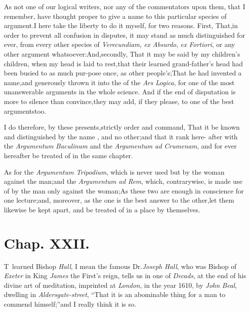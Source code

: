 \documentclass{article}
\begin{document}
As not one of our logical writers, nor any of the commentators
upon them, that I remember, have thought proper to give a name
to this particular species of argument.\tsk  I here take the
liberty to do it myself, for two reasons. First, That,\break in order to
prevent all confusion in disputes, it may stand as much
distinguish\-ed for ever, from every other species of
\textit{Verecundiam},
\textit{ex Absurdo}, 
\textit{ex Fortiori}, or any other argument
whatsoever:\tsh  And,\break secondly, That it may be said by my
children’s children, when my head is laid to
rest,\tsh  that their learned grand-father’s\pb
head had been busied to as much pur-\break pose once, as other
people’s;\tsk  That he had invented a name,\tsk and generously
thrown it into the  of the \textit{Ars
Logica}, for one of the most unanswerable arguments in the whole
science. And if the end of disputation is more to silence than
convince,\tsk  they may add, if they please, to one of the best
arguments\break too.

I do therefore, by these presents,\break strictly order and command,
That it be known and distinguished by the name
, and no other;\tsk  and that it rank here-\break
after with the
\textit{Argumentum Baculinum} and the \textit{Argumentum ad Crumenam},
and for ever hereafter be treated of in the same chapter.

\newpage
As for the \textit{Argumentum Tripodium}, which is never used but
by the woman against the man;\tsk  and the \textit{Argumentum ad
Rem}, which, contrarywise, is made use of by the man only
against the woman;\tsk  As these two are enough in conscience for
one lecture;\tsh  and, moreover, as the one is the best
answer to the other,\tsk  let them likewise be kept apart, and be
treated of in a place by themselves.

\section{Chap. XXII.}

\lettrine{T}{\,} learned Bishop \textit{Hall}, I mean\break 
the famous Dr.\@ \textit{Joseph Hall}, who\break
was Bishop of
\textit{Exeter} in King \textit{James} the First’s reign, tells
us in one of \textit{Decads}, at the end of his divine art of
meditation, imprinted at \textit{London}, in the year 1610, by
\textit{John Beal}, dwelling in \textit{Aldersgate-street},\pb
“That it is an abominable thing for a man to commend himself;”\tsh  and I
really think it is so.
\end{document}
